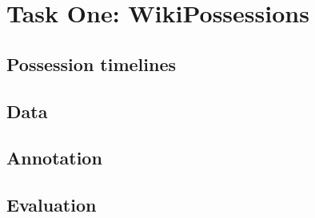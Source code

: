 \section{Task One: WikiPossessions}\label{sec:wposs}

\subsection{Possession timelines}


\subsection{Data}

\subsection{Annotation}

\subsection{Evaluation}




